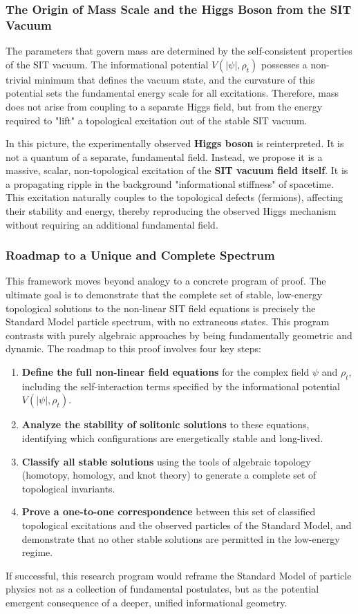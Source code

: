 \subsubsection{The Origin of Mass Scale and the Higgs Boson from the SIT Vacuum}
The parameters that govern mass are determined by the self-consistent properties of the SIT vacuum. The informational potential $V(|\psi|, \rho_t)$ possesses a non-trivial minimum that defines the vacuum state, and the curvature of this potential sets the fundamental energy scale for all excitations. Therefore, mass does not arise from coupling to a separate Higgs field, but from the energy required to "lift" a topological excitation out of the stable SIT vacuum.

In this picture, the experimentally observed \textbf{Higgs boson} is reinterpreted. It is not a quantum of a separate, fundamental field. Instead, we propose it is a massive, scalar, non-topological excitation of the \textbf{SIT vacuum field itself}. It is a propagating ripple in the background "informational stiffness" of spacetime. This excitation naturally couples to the topological defects (fermions), affecting their stability and energy, thereby reproducing the observed Higgs mechanism without requiring an additional fundamental field.

\subsubsection{Roadmap to a Unique and Complete Spectrum}

This framework moves beyond analogy to a concrete program of proof. The ultimate goal is to demonstrate that the complete set of stable, low-energy topological solutions to the non-linear SIT field equations is precisely the Standard Model particle spectrum, with no extraneous states. This program contrasts with purely algebraic approaches by being fundamentally geometric and dynamic. The roadmap to this proof involves four key steps:
\begin{enumerate}
    \item \textbf{Define the full non-linear field equations} for the complex field $\psi$ and $\rho_t$, including the self-interaction terms specified by the informational potential $V(|\psi|, \rho_t)$.
    \item \textbf{Analyze the stability of solitonic solutions} to these equations, identifying which configurations are energetically stable and long-lived.
    \item \textbf{Classify all stable solutions} using the tools of algebraic topology (homotopy, homology, and knot theory) to generate a complete set of topological invariants.
    \item \textbf{Prove a one-to-one correspondence} between this set of classified topological excitations and the observed particles of the Standard Model, and demonstrate that no other stable solutions are permitted in the low-energy regime.
\end{enumerate}
If successful, this research program would reframe the Standard Model of particle physics not as a collection of fundamental postulates, but as the potential emergent consequence of a deeper, unified informational geometry.

